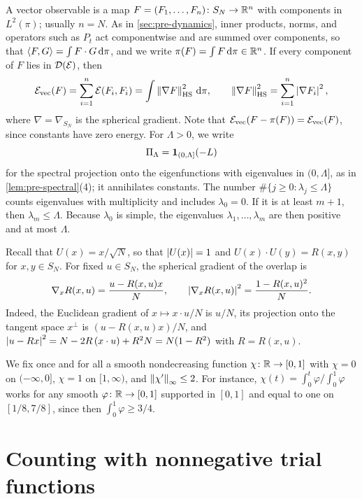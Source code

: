 A vector observable is a map $F=(F_1,\dots,F_n)\colon S_N\to\mathbb R^n$ with components in $L^2(\pi)$; usually $n=N$. As in \cref{sec:pre-dynamics}, inner products, norms, and operators such as $P_t$ act componentwise and are summed over components, so that $\langle F,G\rangle=\int F\cdot G\,\mathrm d\pi$, and we write $\pi(F)=\int F\,\mathrm d\pi\in\mathbb R^n$. If every component of $F$ lies in $\mathcal D(\mathcal E)$, then
\[
\mathcal E_{\rm vec}(F)=\sum_{i=1}^n\mathcal E(F_i,F_i)=\int\left\lVert\nabla F\right\rVert_{\rm HS}^2\,\mathrm d\pi,
\qquad
\left\lVert\nabla F\right\rVert_{\rm HS}^2=\sum_{i=1}^n\left|\nabla F_i\right|^2,
\]
where $\nabla=\nabla_{S_N}$ is the spherical gradient. Note that $\mathcal E_{\rm vec}(F-\pi(F))=\mathcal E_{\rm vec}(F)$, since constants have zero energy. For $\Lambda>0$, we write
\[
\Pi_\Lambda=\mathbf 1_{(0,\Lambda]}(-L)
\]
for the spectral projection onto the eigenfunctions with eigenvalues in $(0,\Lambda]$, as in \cref{lem:pre-spectral}(4); it annihilates constants. The number $\#\{j\ge0:\lambda_j\le\Lambda\}$ counts eigenvalues with multiplicity and includes $\lambda_0=0$. If it is at least $m+1$, then $\lambda_m\le\Lambda$. Because $\lambda_0$ is simple, the eigenvalues $\lambda_1,\dots,\lambda_m$ are then positive and at most $\Lambda$.

Recall that $U(x)=x/\sqrt N$, so that $\left|U(x)\right|=1$ and $U(x)\cdot U(y)=R(x,y)$ for $x,y\in S_N$. For fixed $u\in S_N$, the spherical gradient of the overlap is
\begin{equation}\label{eq:sp-gradR}
\nabla_xR(x,u)=\frac{u-R(x,u)x}{N},\qquad \left|\nabla_xR(x,u)\right|^2=\frac{1-R(x,u)^2}{N}.
\end{equation}
Indeed, the Euclidean gradient of $x\mapsto x\cdot u/N$ is $u/N$, its projection onto the tangent space $x^\perp$ is $(u-R(x,u)x)/N$, and $\left|u-Rx\right|^2=N-2R\,(x\cdot u)+R^2N=N(1-R^2)$ with $R=R(x,u)$.

We fix once and for all a smooth nondecreasing function $\chi\colon\mathbb R\to[0,1]$ with $\chi=0$ on $(-\infty,0]$, $\chi=1$ on $[1,\infty)$, and $\left\lVert\chi'\right\rVert_\infty\le2$. For instance, $\chi(t)=\int_0^t\varphi/\int_0^1\varphi$ works for any smooth $\varphi\colon\mathbb R\to[0,1]$ supported in $[0,1]$ and equal to one on $[1/8,7/8]$, since then $\int_0^1\varphi\ge3/4$.

\section{Counting with nonnegative trial functions}\label{sec:sp-frame}

